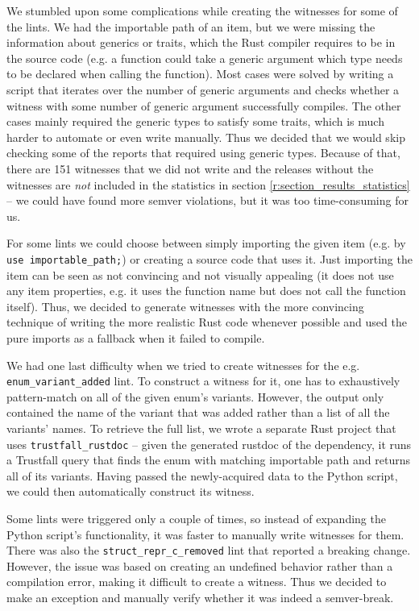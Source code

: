 \documentclass[licencjacka,en]{pracamgr}
\begin{document}
We stumbled upon some complications while creating the witnesses for some of the lints.
We had the importable path of an item, but we were missing the information
about generics or traits, which the Rust compiler requires to be in the source code
(e.g. a function could take a generic argument which type needs to be declared when calling the function).
Most cases were solved by writing a script that iterates over the number of generic arguments
and checks whether a witness with some number of generic argument successfully compiles.
The other cases mainly required the generic types to satisfy some traits,
which is much harder to automate or even write manually.
Thus we decided that we would skip checking some of the reports that required using generic types.
Because of that, there are 151 witnesses that we did not write
and the releases without the witnesses are \textit{not} included in the statistics in section \ref{r:section_results_statistics}
-- we could have found more semver violations, but it was too time-consuming for us.

For some lints we could choose between simply importing the given item
(e.g. by \texttt{use importable\_path;}) or creating a source code that uses it.
Just importing the item can be seen as not convincing and not visually appealing (it does not use any item properties,
e.g. it uses the function name but does not call the function itself).
Thus, we decided to generate witnesses with the more convincing technique of writing the more realistic Rust code whenever possible
and used the pure imports as a fallback when it failed to compile.

We had one last difficulty when we tried to create witnesses for the e.g. \texttt{enum\_variant\_added} lint.
To construct a witness for it, one has to exhaustively pattern-match
on all of the given enum's variants. However, the output only contained the name
of the variant that was added rather than a list of all the variants' names.
To retrieve the full list, we wrote a separate
Rust project that uses \texttt{trustfall\_rustdoc} -- given the generated rustdoc of the dependency,
it runs a Trustfall query that finds the enum with matching importable path and returns
all of its variants. Having passed the newly-acquired data to the Python script,
we could then automatically construct its witness.

Some lints were triggered only a couple of times, so instead of expanding the Python script's functionality, it was faster to manually write witnesses for them.
There was also the \texttt{struct\_repr\_c\_removed} lint that reported a breaking change.
However, the issue was based on creating an undefined behavior rather than a compilation error,
making it difficult to create a witness.
Thus we decided to make an exception and manually verify whether it was indeed a semver-break.
\end{document}
